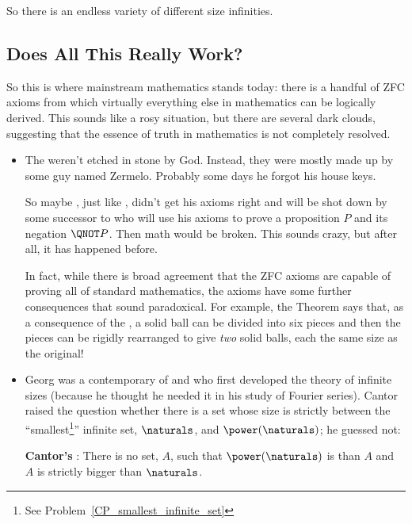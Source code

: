 So there is an endless variety of different size infinities.

\subsection{Does All This Really Work?}\label{setsreallywork}

So this is where mainstream mathematics stands today: there is a handful
of ZFC axioms from which virtually everything else in mathematics can be
logically derived.  This sounds like a rosy situation, but there are
several dark clouds, suggesting that the essence of truth in mathematics
is not completely resolved.

%
\begin{itemize}

\item The  weren't etched in stone by God.  Instead, they were
  mostly made up by some guy named Zermelo.  Probably some days he forgot
  his house keys.

  So maybe , just like , didn't get his axioms right and will
  be shot down by some successor to  who will use his axioms to
  prove a proposition $P$ and its negation $\QNOT P$.  Then math would be
  broken.  This sounds crazy, but after all, it has happened before.

  In fact, while there is broad agreement that the ZFC axioms are capable
  of proving all of standard mathematics, the axioms have some further
  consequences that sound paradoxical.  For example, the 
  Theorem says that, as a consequence of the , a solid ball
  can be divided into six pieces and then the pieces can be rigidly
  rearranged to give \emph{two} solid balls, each the same size as the
  original!

\item Georg  was a contemporary of  and
   who first developed the theory of infinite sizes (because
  he thought he needed it in his study of Fourier series).  Cantor raised
  the question whether there is a set whose size is strictly between the
  ``smallest\footnote{See Problem~\ref{CP_smallest_infinite_set}}''
  infinite set, $\naturals$, and $\power(\naturals)$; he guessed not:

  \textbf{Cantor's }: There is no set, $A$,
  such that $\power(\naturals)$ is  than $A$ and $A$
  is strictly bigger than $\naturals$.


\end{itemize}
